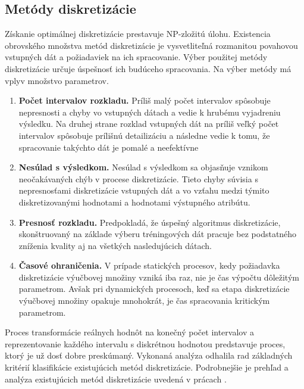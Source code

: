 \subsection{Metódy diskretizácie}
Získanie optimálnej diskretizácie prestavuje NP-zložitú úlohu. \cite{levashenkoProj, Chelbus1998} Existencia obrovského množstva metód diskretizácie je vysvetliteľná rozmanitou povahovou vstupných dát a požiadaviek na ich spracovanie. Výber použitej metódy diskretizácie určuje úspešnosť ich budúceho spracovania. Na výber metódy má vplyv množstvo parametrov.  \cite{levashenkoProj}
\begin{enumerate}
	\item \textbf{Počet intervalov rozkladu.}  Príliš malý počet intervalov spôsobuje nepresnosti a chyby vo vstupných dátach a vedie k hrubému vyjadreniu výsledku. Na druhej strane rozklad vstupných dát na príliš veľký počet intervalov spôsobuje prílišnú detailizáciu a následne vedie k tomu, že spracovanie takýchto dát je pomalé a neefektívne  \cite{levashenkoProj, Catlett1991}%
	\item \textbf{Nesúlad s výsledkom. }  Nesúlad s výsledkom sa objasňuje vznikom neočakávaných chýb v procese diskretizácie. Tieto chyby súvisia s nepresnosťami diskretizácie vstupných dát a vo vzťahu medzi týmito diskretizovanými hodnotami a hodnotami výstupného atribútu.  \cite{levashenkoProj}
	\item \textbf{Presnosť rozkladu.}  Predpokladá, že úspešný algoritmus diskretizácie, skonštruovaný na základe výberu tréningových dát pracuje bez podstatného zníženia kvality aj na všetkých nasledujúcich dátach.  \cite{levashenkoProj}
	\item \textbf{Časové ohraničenia.}  V prípade statických procesov, kedy požiadavka diskretizácie výučbovej množiny vzniká iba raz, nie je čas výpočtu dôležitým parametrom. Avšak pri dynamických procesoch, keď sa etapa diskretizácie výučbovej množiny opakuje mnohokrát, je čas spracovania kritickým parametrom.  \cite{levashenkoProj}
\end{enumerate}

Proces transformácie reálnych hodnôt na konečný počet intervalov a reprezentovanie každého intervalu s diskrétnou hodnotou predstavuje proces, ktorý je už dosť dobre preskúmaný. Vykonaná analýza odhalila rad základných kritérií klasifikácie existujúcich metód diskretizácie. Podrobnejšie je prehľad a analýza existujúcich metód diskretizácie uvedená v prácach \cite{Lui2002, Liu2004, Singh2007, Bakar2009, Yang2010, Garcia2010, Garcia2013} . 

